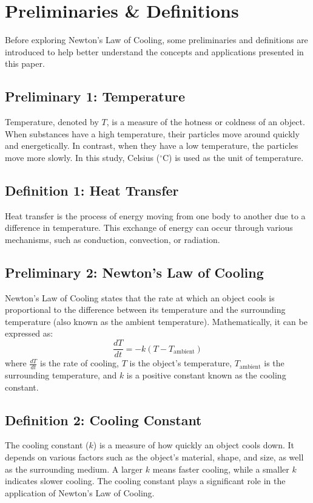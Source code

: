 \documentclass[12pt, a4paper]{article}
\begin{document}
\section{Preliminaries \& Definitions}
Before exploring Newton's Law of Cooling, some preliminaries and definitions are introduced to help better understand the concepts and applications presented in this paper.

\subsection{Preliminary 1: Temperature}
Temperature, denoted by $T$, is a measure of the hotness or coldness of an object. When substances have a high temperature, their particles move around quickly and energetically. In contrast, when they have a low temperature, the particles move more slowly. In this study, Celsius ($^\circ$C) is used as the unit of temperature.

\subsection{Definition 1: Heat Transfer}
Heat transfer is the process of energy moving from one body to another due to a difference in temperature. This exchange of energy can occur through various mechanisms, such as conduction, convection, or radiation.

\subsection{Preliminary 2: Newton's Law of Cooling}
Newton's Law of Cooling states that the rate at which an object cools is proportional to the difference between its temperature and the surrounding temperature (also known as the ambient temperature). Mathematically, it can be expressed as:
\begin{equation}
    \frac{dT}{dt} = -k(T - T_{\text{ambient}})
\end{equation}
where $\frac{dT}{dt}$ is the rate of cooling, $T$ is the object's temperature, $T_{\text{ambient}}$ is the surrounding temperature, and $k$ is a positive constant known as the cooling constant.

\subsection{Definition 2: Cooling Constant}
The cooling constant ($k$) is a measure of how quickly an object cools down. It depends on various factors such as the object's material, shape, and size, as well as the surrounding medium. A larger $k$ means faster cooling, while a smaller $k$ indicates slower cooling. The cooling constant plays a significant role in the application of Newton's Law of Cooling.
\end{document}
